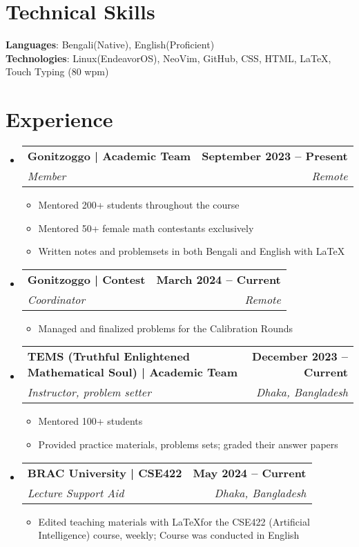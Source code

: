 \documentclass[letterpaper,11pt]{article}
\makeatletter
\newcommand{\resumeItem}[1]{
  \item{
    {#1 \vspace{-2pt}}
  }
}
\newcommand{\resumeSubheading}[4]{
  \vspace{-2pt}\item
    \begin{tabular*}{1.0\textwidth}[t]{l@{\extracolsep{\fill}}r}
      \textbf{#1} & \textbf{\small #2} \\
      \textit{\small#3} & \textit{\small #4} \\
    \end{tabular*}\vspace{-7pt}
}
\newcommand{\resumeSubHeadingListStart}{\begin{itemize}[leftmargin=0.0in, label={}]}
\newcommand{\resumeSubHeadingListEnd}{\end{itemize}}
\newcommand{\resumeItemListStart}{\begin{itemize}}
\newcommand{\resumeItemListEnd}{\end{itemize}\vspace{-5pt}}
\makeatother
\begin{document}
\section{Technical Skills}
 \begin{itemize}[leftmargin=0.15in, label={}]
    \small{\item{
     \textbf{Languages}{: Bengali(Native), English(Proficient)} \\
     \textbf{Technologies}{: Linux(EndeavorOS), NeoVim, GitHub, CSS, HTML, \LaTeX, Touch Typing (80 wpm) } \\
    }}
 \end{itemize} 


\section{Experience}
  \resumeSubHeadingListStart

    \resumeSubheading
      {Gonitzoggo | Academic Team }{September 2023 -- Present}
      {Member }{Remote}
      \resumeItemListStart
        \resumeItem{Mentored 200+ students throughout the course}
        \resumeItem{Mentored 50+ female math contestants exclusively}
        \resumeItem{Written notes and problemsets in both Bengali and English with \LaTeX}
      \resumeItemListEnd
  
    \resumeSubheading
      {Gonitzoggo | Contest}{March 2024 -- Current}
      {Coordinator}{Remote}
      \resumeItemListStart
      \resumeItem{Managed and finalized problems for the Calibration Rounds}
      \resumeItemListEnd

    \resumeSubheading
    {TEMS (Truthful Enlightened Mathematical Soul) | Academic Team }{December 2023 -- Current}
      {Instructor, problem setter}{Dhaka, Bangladesh}
      \resumeItemListStart
        \resumeItem{Mentored 100+ students}
        \resumeItem{Provided practice materials, problems sets; graded their answer papers}
      \resumeItemListEnd

    \resumeSubheading
      {BRAC University | CSE422 }{May 2024 -- Current}
      {Lecture Support Aid}{Dhaka, Bangladesh}
      \resumeItemListStart
        \resumeItem{Edited teaching materials with \LaTeX for the CSE422 (Artificial Intelligence) course, weekly; Course was conducted in English}
      \resumeItemListEnd
      
   
  \resumeSubHeadingListEnd

\end{document}
